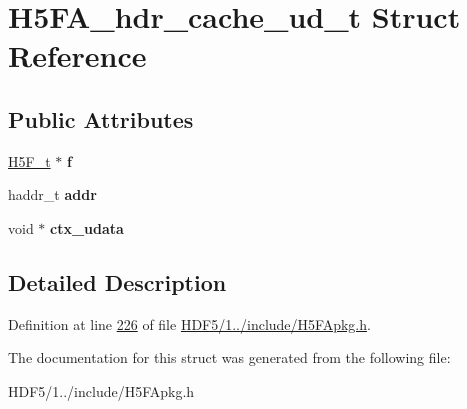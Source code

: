 \hypertarget{struct_h5_f_a__hdr__cache__ud__t}{}\section{H5\+F\+A\+\_\+hdr\+\_\+cache\+\_\+ud\+\_\+t Struct Reference}
\label{struct_h5_f_a__hdr__cache__ud__t}
\subsection*{Public Attributes}
\begin{DoxyCompactItemize}
\item 
\mbox{\label{struct_h5_f_a__hdr__cache__ud__t_ae634176623e646241b29aac747c81d16}} 
\hyperlink{struct_h5_f__t}{H5\+F\+\_\+t} $\ast$ {\bfseries f}
\item 
\mbox{\label{struct_h5_f_a__hdr__cache__ud__t_a6cea1e8a91c0b22e7399f01a2c6cc6d2}} 
haddr\+\_\+t {\bfseries addr}
\item 
\mbox{\label{struct_h5_f_a__hdr__cache__ud__t_a08ea3e45ab510d4149adc45df87f34f2}} 
void $\ast$ {\bfseries ctx\+\_\+udata}
\end{DoxyCompactItemize}


\subsection{Detailed Description}


Definition at line \hyperlink{_h_d_f5_21_810_81_2include_2_h5_f_apkg_8h_source_l00226}{226} of file \hyperlink{_h_d_f5_21_810_81_2include_2_h5_f_apkg_8h_source}{H\+D\+F5/1../include/\+H5\+F\+Apkg.\+h}.



The documentation for this struct was generated from the following file\+:\begin{DoxyCompactItemize}
\item 
H\+D\+F5/1../include/\+H5\+F\+Apkg.\+h\end{DoxyCompactItemize}
